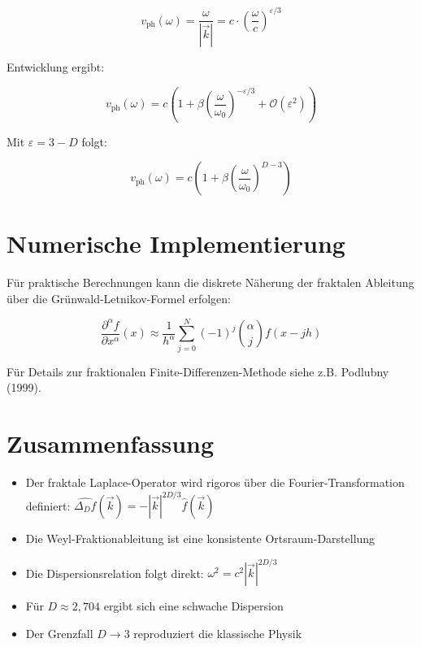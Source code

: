 \[
v_{\text{ph}}(\omega) = \frac{\omega}{|\vec{k}|} = c \cdot \left( \frac{\omega}{c} \right)^{\varepsilon/3}
\]

Entwicklung ergibt:

\[
v_{\text{ph}}(\omega) = c \left( 1 + \beta \left( \frac{\omega}{\omega_0} \right)^{-\varepsilon/3} + \mathcal{O}(\varepsilon^2) \right)
\]

Mit \( \varepsilon = 3 - D \) folgt:

\[
v_{\text{ph}}(\omega) = c \left( 1 + \beta \left( \frac{\omega}{\omega_0} \right)^{D-3} \right) \tag{E.7}
\]

\section{Numerische Implementierung}

Für praktische Berechnungen kann die diskrete Näherung der fraktalen Ableitung 
über die Grünwald-Letnikov-Formel erfolgen:

\[
\frac{\partial^{\alpha} f}{\partial x^{\alpha}}(x) \approx \frac{1}{h^{\alpha}} \sum_{j=0}^{N} (-1)^j \binom{\alpha}{j} f(x - jh) \tag{E.8}
\]

Für Details zur fraktionalen Finite-Differenzen-Methode siehe z.B. Podlubny (1999).

\section{Zusammenfassung}

\begin{itemize}
    \item Der fraktale Laplace-Operator wird rigoros über die Fourier-Transformation 
          definiert: \( \widehat{\Delta_D f}(\vec{k}) = -|\vec{k}|^{2D/3} \hat{f}(\vec{k}) \)
    \item Die Weyl-Fraktionableitung ist eine konsistente Ortsraum-Darstellung
    \item Die Dispersionsrelation folgt direkt: \( \omega^2 = c^2 |\vec{k}|^{2D/3} \)
    \item Für \( D \approx 2,704 \) ergibt sich eine schwache Dispersion
    \item Der Grenzfall \( D \to 3 \) reproduziert die klassische Physik
\end{itemize}